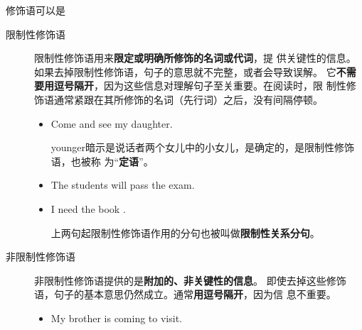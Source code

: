 修饰语可以是
\begin{description}
\item[限制性修饰语] 限制性修饰语用来\textbf{限定或明确所修饰的名词或代词}，提
  供关键性的信息。如果去掉限制性修饰语，句子的意思就不完整，或者会导致误解。
  它\textbf{不需要用逗号隔开}，因为这些信息对理解句子至关重要。在阅读时，限
  制性修饰语通常紧跟在其所修饰的名词（先行词）之后，没有间隔停顿。
  \begin{itemize}

  \item Come and see my  daughter.

    younger暗示是说话者两个女儿中的小女儿，是确定的，是限制性修饰语，也被称
    为“\textbf{定语}”。

  \item The students  will pass the exam.

  \item I need the book .

    上两句起限制性修饰语作用的分句也被叫做\textbf{限制性关系分句}。

  \end{itemize}


\item[非限制性修饰语] 非限制性修饰语提供的是\textbf{附加的、非关键性的信息}。
  即使去掉这些修饰语，句子的基本意思仍然成立。通常\textbf{用逗号隔开}，因为信
  息不重要。
  \begin{itemize}
  \item My brother is coming to visit.
  \end{itemize}

\end{description}

